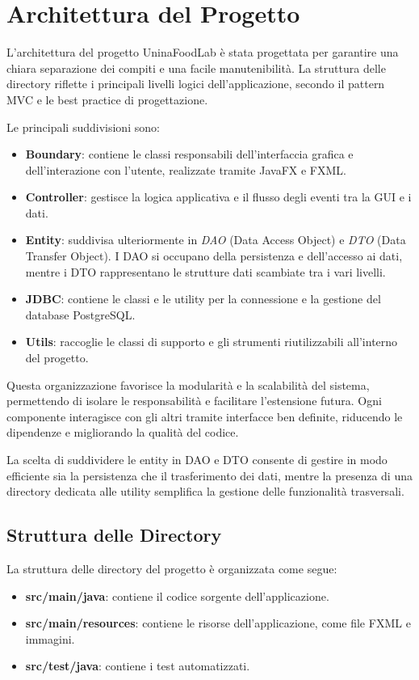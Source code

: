 \section{Architettura del Progetto}

L'architettura del progetto UninaFoodLab è stata progettata per garantire una chiara separazione dei compiti e una facile manutenibilità. La struttura delle directory riflette i principali livelli logici dell'applicazione, secondo il pattern MVC e le best practice di progettazione.

Le principali suddivisioni sono:
\begin{itemize}
    \item \textbf{Boundary}: contiene le classi responsabili dell'interfaccia grafica e dell'interazione con l'utente, realizzate tramite JavaFX e FXML.
    \item \textbf{Controller}: gestisce la logica applicativa e il flusso degli eventi tra la GUI e i dati.
    \item \textbf{Entity}: suddivisa ulteriormente in \textit{DAO} (Data Access Object) e \textit{DTO} (Data Transfer Object). I DAO si occupano della persistenza e dell'accesso ai dati, mentre i DTO rappresentano le strutture dati scambiate tra i vari livelli.
    \item \textbf{JDBC}: contiene le classi e le utility per la connessione e la gestione del database PostgreSQL.
    \item \textbf{Utils}: raccoglie le classi di supporto e gli strumenti riutilizzabili all'interno del progetto.
\end{itemize}
Questa organizzazione favorisce la modularità e la scalabilità del sistema, permettendo di isolare le responsabilità e facilitare l'estensione futura. Ogni componente interagisce con gli altri tramite interfacce ben definite, riducendo le dipendenze e migliorando la qualità del codice.

La scelta di suddividere le entity in DAO e DTO consente di gestire in modo efficiente sia la persistenza che il trasferimento dei dati, mentre la presenza di una directory dedicata alle utility semplifica la gestione delle funzionalità trasversali.

\subsection{Struttura delle Directory}
La struttura delle directory del progetto è organizzata come segue:
\begin{itemize}
    \item \textbf{src/main/java}: contiene il codice sorgente dell'applicazione.
    \item \textbf{src/main/resources}: contiene le risorse dell'applicazione, come file FXML e immagini.
    \item \textbf{src/test/java}: contiene i test automatizzati.
\end{itemize}


